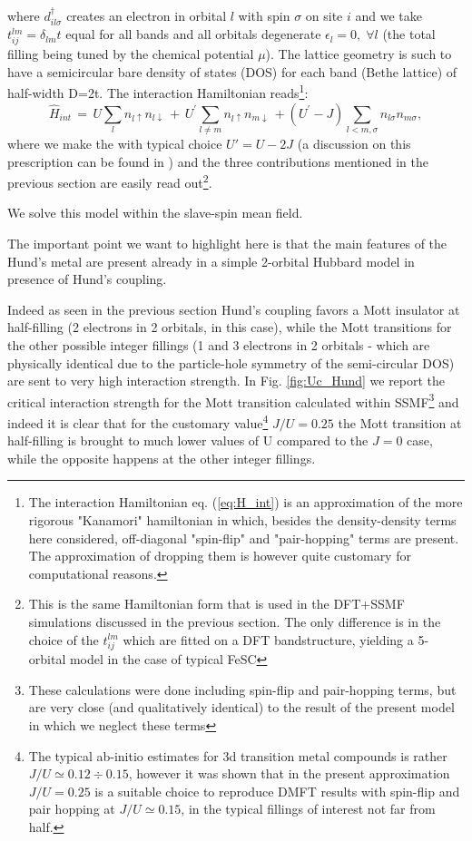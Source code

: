 \documentclass[12pt,twoside]{article}
\def\be{\begin{equation}}
\def\ee{\end{equation}}
\def\spinup{\uparrow}
\def\spindown{\downarrow}
\def\eps{\epsilon}
\def\s{\sigma}
\def\up{\spinup}
\def\down{\spindown}
\begin{document}
where $d^\dag_{il\s}$ creates an electron in orbital $l$ with spin $\s$ on site $i$ and we take $t^{l m}_{ij}=\delta_{lm}t$ equal for all bands and all orbitals degenerate $\eps_l=0, \; \forall l$ (the total filling being tuned by the chemical potential $\mu$). The lattice geometry is such to have a semicircular bare density of states (DOS) for each band (Bethe lattice) of half-width D=2t.
The interaction Hamiltonian reads\footnote{The interaction Hamiltonian eq. (\ref{eq:H_int}) is an approximation of the more rigorous "Kanamori" hamiltonian in which, besides the density-density terms here considered, off-diagonal "spin-flip" and "pair-hopping" terms are present. The approximation of dropping them is however quite customary for computational reasons.}:
\be
\hat H_{int}\,=\,U\sum_l n_{l\up}n_{l\down}\,+\,U^\prime\sum_{l\neq m} n_{l\up}n_{m\down}\,
+(U^\prime-J) \sum_{l<m,\sigma} n_{l\s}n_{m\s},
\label{eq:H_int}
\ee
where we make the with typical choice $U'=U-2J$ (a discussion on this prescription can be found in \cite{georges_annrev}) and the three contributions mentioned in the previous section are easily read out\footnote{This is the same Hamiltonian form that is used in the DFT+SSMF simulations discussed in the previous section. The only difference is in the choice of the $t^{l m}_{ij}$ which are fitted on a DFT bandstructure, yielding a 5-orbital model in the case of typical FeSC}.

We solve this model within the slave-spin mean field\cite{demedici_Vietri}. 

The important point we want to highlight here is that the main features of the Hund's metal are present already in a simple 2-orbital Hubbard model in presence of Hund's coupling. 

Indeed as seen in the previous section Hund's coupling favors a Mott insulator at half-filling (2 electrons in 2 orbitals, in this case), while the Mott transitions for the other possible integer fillings (1 and 3 electrons in 2 orbitals - which are physically identical due to the particle-hole symmetry of the semi-circular DOS) are sent to very high interaction strength.
In Fig. \ref{fig:Uc_Hund} we report the critical interaction strength for the Mott transition calculated within SSMF\footnote{These calculations were done including spin-flip and pair-hopping terms, but are very close (and qualitatively identical) to the result of the present model in which we neglect these terms} and indeed it is clear that for the customary value\footnote{The typical ab-initio estimates for 3d transition metal compounds is rather $J/U\simeq 0.12\div 0.15$, however it was shown\cite{demedici_Vietri} that in the present approximation $J/U=0.25$ is a suitable choice to reproduce DMFT results with spin-flip and pair hopping at $J/U\simeq 0.15$, in the typical fillings of interest not far from half.} $J/U=0.25$ the Mott transition at half-filling is brought to much lower values of U compared to the $J=0$ case, while the opposite happens at the other integer fillings.
\end{document}
